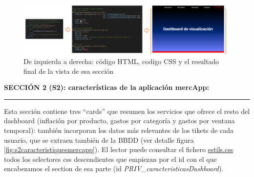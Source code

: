 \documentclass[a4paper,12pt]{report}
\begin{document}
	\FloatBarrier
	\setlength{\belowcaptionskip}{3pt}
	\begin{figure}[H]
		\centering
		\caption{De izquierda a derecha: código HTML, codigo CSS y el resultado final de la vista de esa sección}
		\includegraphics[width=1\linewidth]{img/S1FrontMakeOf.png}
		
		
		\label{fig:S1FrontMakeOf}
	\end{figure}
	\FloatBarrier
	
	
	
	
	\noindent \textbf{SECCIÓN 2 (S2): características de la aplicación mercApp:}
	\hrule
	\vspace{.5em}
	
	Esta sección contiene tres ``cards'' que resumen los servicios que ofrece el resto del dashboard (inflación por producto, gastos por categoría y gastos por ventana temporal): también incorporan los datos más relevantes de los tikets de cada usuario, que se extraen también de la BBDD (ver detalle figura \ref{fig:s2caracteristiquesmercapp}). El lector puede consultar el fichero \href{https://github.com/blackcub3s/mercApp/blob/main/APP%20WEB/__frontend__produccio__/app/css/dashboard/estils.css}{estils.css} todos los selectores css descendientes que empiezan por el id con el que encabezamos el section de esa parte (id \textit{PRIV\_caracteristicasDashboard}).
\end{document}
